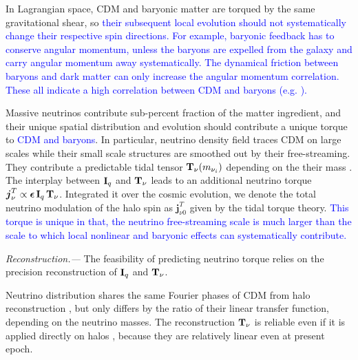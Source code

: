 \documentclass[aps,prd,twocolumn,amsmath,amssymb,amsfont,superscriptaddress,nofootinbib]{revtex4-1}
\newcommand{\bs}{\boldsymbol}
\newcommand{\diff}{{\mathrm d}}
\newcommand{\T}{\bold{T}}
\newcommand{\I}{\bold{I}}
\newcommand{\spin}{\bs{j}}
\newcommand{\tcb}{\textcolor{blue}}
\begin{document}
In Lagrangian space, CDM and baryonic matter are torqued by the same gravitational shear, so 
\tcb{their subsequent local evolution should not systematically change their respective spin directions.
For example, baryonic feedback has to conserve angular momentum, unless the baryons are expelled from the galaxy and carry angular momentum away systematically.
The dynamical friction between baryons and dark matter can only increase the angular momentum correlation.
These all indicate a high correlation between CDM and baryons (e.g. \citep{2018arXiv180407306J}).} 
 
Massive neutrinos contribute sub-percent fraction of the matter ingredient, and their unique spatial distribution and evolution should contribute a unique torque to \tcb{CDM and baryons}.
In particular, neutrino density field traces CDM on large scales while their small scale structures are smoothed out by their free-streaming. 
They contribute a predictable tidal tensor $\T_\nu(m_{\nu_i})$ depending on the their mass \citep{2015PhRvD..92b3502I}. 
The interplay between $\I_q$ and $\T_\nu$ leads to an additional neutrino torque $\spin^T_\nu\propto\bs{\epsilon}\,\I_q\,\T_\nu$.
Integrated it over the cosmic evolution, we denote the total neutrino modulation of the halo spin as $\spin^T_{\nu 0}$ given by the tidal torque theory.
\tcb{
This torque is unique in that, the neutrino free-streaming scale is much larger than the scale to which local nonlinear and baryonic effects can systematically contribute.
}



\textit{Reconstruction.---}
The feasibility of predicting neutrino torque relies on the precision reconstruction of $\I_q$ and $\T_\nu$.

Neutrino distribution shares the same Fourier phases of CDM from halo reconstruction \citep{2015PhRvD..92b3502I,2017ApJ...847..110Y}, but only differs by the ratio of their linear transfer function, depending on the neutrino masses. The reconstruction $\T_\nu$ is reliable even if it is applied directly on halos \citep{2015PhRvD..92b3502I}, because they are relatively linear even at present epoch.
\end{document}
